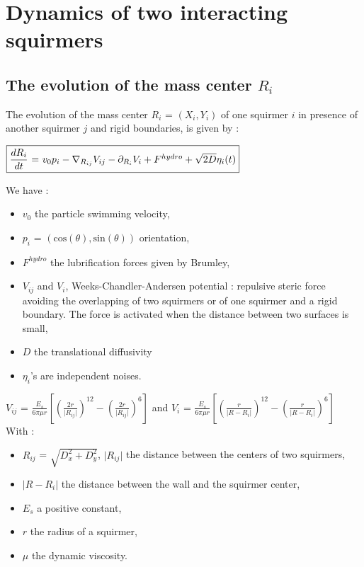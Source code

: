 \documentclass{article}
\begin{document}
\section{Dynamics of two interacting squirmers}
\subsection{The evolution of the mass center $R_i$}
The evolution of the mass center $R_i$ = $(X_i, Y_i)$ of one squirmer $i$ in presence of 
another squirmer $j$ and rigid boundaries, is given by :
\begin{center}
$\boxed{\frac{dR_i}{dt}$ = $v_0 p_i -  \nabla_{R_{ij}} V_{ij} - \partial_{R_i} V_i + F^{hydro} + \sqrt{2D}\eta_i(t)}$
\end{center}
We have : \begin{itemize}
    \item $v_0$ the particle swimming velocity,
    \item $p_i$ = $(\mathrm{cos}(\theta),\mathrm{sin}(\theta))$ orientation,
    \item $F^{hydro}$ the lubrification forces given by Brumley\cite{Brumley},
    \item $V_{ij}$ and $V_i$, Weeks-Chandler-Andersen potential : repulsive steric force avoiding the overlapping of two squirmers or of one squirmer and a rigid boundary. The force is activated when the distance between two surfaces is small,
    \item $D$ the translational diffusivity
    \item $\eta_i$'s are independent noises. 
\end{itemize} 
\vspace{0,5cm}
$V_{ij}$ = $\frac{E_s}{6\pi\mu r}\left[\left(\frac{2r}{\lvert R_{ij}\rvert}\right)^{12} - \left(\frac{2r}{\lvert R_{ij}\rvert}\right)^6\right]$ and  $V_i$ = $\frac{E_s}{6\pi\mu r} \left[ \left( \frac{r}{\lvert R - R_i \rvert} \right)^{12} - \left( \frac{r}{\lvert R - R_i \rvert} \right) ^6 \right]$ 
\vspace{0,3cm}
\\With : \begin{itemize}
    \item $R_{ij}$ = $\sqrt{D_x^2+D_y^2}$, $\lvert R_{ij} \rvert$ the distance between the centers of two squirmers,
    \item $\lvert R - R_i\rvert$ the distance between the wall and the squirmer center,
    \item $E_s$ a positive constant,
    \item $r$ the radius of a squirmer,
    \item $\mu$ the dynamic viscosity.
\end{itemize}
\end{document}
